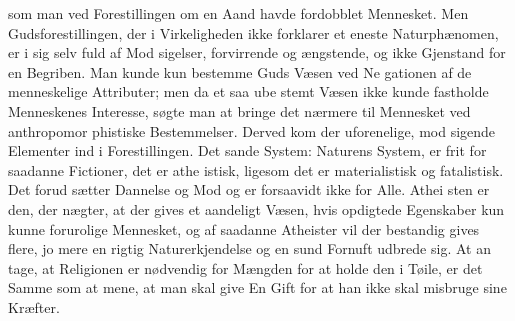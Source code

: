 \documentclass[12pt,a4paper]{book}
\begin{document}
som man ved Forestillingen om en Aand havde fordobblet
Mennesket. Men Gudsforestillingen, der i Virkeligheden ikke
forklarer et eneste Naturphænomen, er i sig selv fuld af Mod\-%
sigelser, forvirrende og ængstende, og ikke Gjenstand for en
Begriben. Man kunde kun bestemme Guds Væsen ved Ne\-%
gationen af de menneskelige Attributer; men da et saa ube\-%
stemt Væsen ikke kunde fastholde Menneskenes Interesse, søgte
man at bringe det nærmere til Mennesket ved anthropomor\-%
phistiske Bestemmelser. Derved kom der uforenelige, mod\-%
sigende Elementer ind i Forestillingen. Det sande System:
Naturens System, er frit for saadanne Fictioner, det er athe\-%
istisk, ligesom det er materialistisk og fatalistisk. Det forud\-%
sætter Dannelse og Mod og er forsaavidt ikke for Alle. Athei\-%
sten er den, der nægter, at der gives et aandeligt Væsen, hvis
opdigtede Egenskaber kun kunne forurolige Mennesket, og af
saadanne Atheister vil der bestandig gives flere, jo mere en
rigtig Naturerkjendelse og en sund Fornuft udbrede sig. At an\-%
tage, at Religionen er nødvendig for Mængden for at holde
den i Tøile, er det Samme som at mene, at man skal give
En Gift for at han ikke skal misbruge sine Kræfter.
\end{document}
